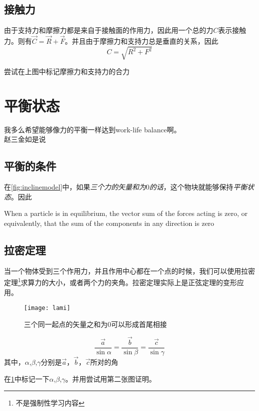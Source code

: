 \subsection*{接触力}
由于支持力和摩擦力都是来自于接触面的作用力，因此用一个总的力$C$表示接触力。则有$\vec{C}=\vec{R}+\vec{F}$。并且由于摩擦力和支持力总是垂直的关系，因此
\[
	C=\sqrt{R^2+F^2}
\]

\begin{TaskBox}
尝试在上图中标记摩擦力和支持力的合力
\end{TaskBox}
\clearpage


\section{平衡状态}
\label{sec:Conditions for equilibrium}
我多么希望能够像力的平衡一样达到work-life balance啊。\\
\makebox{}\hfill 赵三金如是说

\subsection*{平衡的条件}
在\ref{fig:inclinemodel}中，如果\emph{三个力的矢量和为$0$的话}，这个物块就能够保持\emph{平衡状态}。因此
\begin{definition}
When a particle is in equilibrium, the vector sum of the forces acting is zero, or equivalently, that the sum of the components in any direction is zero
\end{definition}

\subsection*{拉密定理}
\label{subsec:Lami's Theorem}
当一个物体受到三个作用力，并且作用中心都在一个点的时候，我们可以使用拉密定理\footnote{不是强制性学习内容}求算力的大小，或者两个力的夹角。拉密定理实际上是正弦定理的变形应用。
\begin{figure}[H]
\centering
\texttt{[image: lami]}
\caption{三个同一起点的矢量之和为$0$可以形成首尾相接}
\label{fig:lami}
\end{figure}

\[
	\frac{\vec{a}}{\sin \alpha}=\frac{\vec{b}}{\sin \beta}=\frac{\vec{c}}{\sin \gamma}
\]
其中，$\alpha$,$\beta$,$\gamma$分别是$\vec{a}$，$\vec{b}$，$\vec{c}$所对的角

\begin{TaskBox}
在\ref{fig:lami}中标记一下$\alpha$,$\beta$,$\gamma$。并用尝试用第二张图证明。
\end{TaskBox}


